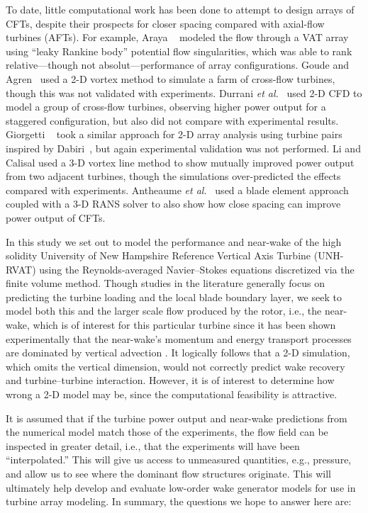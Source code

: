 To date, little computational work has been done to attempt to design arrays of
CFTs, despite their prospects for closer spacing compared with axial-flow
turbines (AFTs). For example, Araya \etal~\cite{Araya2014} modeled the flow
through a VAT array using ``leaky Rankine body'' potential flow singularities,
which was able to rank relative---though not absolut---performance of array
configurations. Goude and Agren~\cite{Goude2010} used a 2-D vortex method to
simulate a farm of cross-flow turbines, though this was not validated with
experiments. Durrani \emph{et al.}~\cite{Durrani2011} used 2-D CFD to model a
group of cross-flow turbines, observing higher power output for a staggered
configuration, but also did not compare with experimental results. Giorgetti
\etal~\cite{Giorgetti2015} took a similar approach for 2-D array analysis using
turbine pairs inspired by Dabiri~\cite{Dabiri2011}, but again experimental
validation was not performed. Li and Calisal \cite{Li2010} used a 3-D vortex
line method to show mutually improved power output from two adjacent turbines,
though the simulations over-predicted the effects compared with experiments.
Antheaume \emph{et al.}~\cite{Antheaume2008} used a blade element approach
coupled with a 3-D RANS solver to also show how close spacing can improve power
output of CFTs.

In this study we set out to model the performance and near-wake of the high
solidity University of New Hampshire Reference Vertical Axis Turbine (UNH-RVAT)
using the Reynolds-averaged Navier--Stokes equations discretized via the finite
volume method. Though studies in the literature generally focus on predicting
the turbine loading and the local blade boundary layer, we seek to model both
this and the larger scale flow produced by the rotor, i.e., the near-wake, which
is of interest for this particular turbine since it has been shown
experimentally that the near-wake's momentum and energy transport processes are
dominated by vertical advection \cite{Bachant2015-JoT}. It logically follows
that a 2-D simulation, which omits the vertical dimension, would not correctly
predict wake recovery and turbine--turbine interaction. However, it is of
interest to determine how wrong a 2-D model may be, since the computational
feasibility is attractive.

It is assumed that if the turbine power output and near-wake predictions from
the numerical model match those of the experiments, the flow field can be
inspected in greater detail, i.e., that the experiments will have been
``interpolated.'' This will give us access to unmeasured quantities, e.g.,
pressure, and allow us to see where the dominant flow structures originate. This
will ultimately help develop and evaluate low-order wake generator models for
use in turbine array modeling. In summary, the questions we hope to answer here
are:

